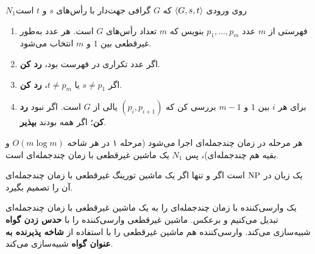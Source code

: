 \begin{example}
\begin{algo}{$N_1$}{روی ورودی $\langle G,s,t\rangle$ که $G$ گرافی جهت‌دار با رأس‌های $s$ و $t$ است}
\begin{enumerate}
\item فهرستی از $m$ عدد $p_1,\dots,p_m$ بنویس که $m$ تعداد رأس‌های $G$ است. هر عدد به‌طور غیرقطعی بین $1$ و $m$ انتخاب می‌شود.
\item اگر عدد تکراری در فهرست بود، \textbf{رد کن}.
\item اگر $s\neq p_1$ یا $t\neq p_m$، \textbf{رد کن}.
\item برای هر $i$ بین $1$ و $m-1$ بررسی کن که $(p_i,p_{i+1})$ یالی از $G$ است. اگر نبود \textbf{رد کن}؛ اگر همه بودند \textbf{بپذیر}.
\end{enumerate}
\end{algo}
هر مرحله در زمان چندجمله‌ای اجرا می‌شود (مرحله ۱ در هر شاخه $O(m\log m)$ و بقیه هم چندجمله‌ای)، پس $N_1$ یک ماشین غیرقطعی با زمان چندجمله‌ای است.
\end{example}

\begin{theorem}\label{thm:np-ntm}
یک زبان در $\mathrm{NP}$ است اگر و تنها اگر یک ماشین تورینگ غیرقطعی با زمان چندجمله‌ای آن را تصمیم بگیرد.
\end{theorem}

\begin{proofidea}
یک وارسی‌کننده با زمان چندجمله‌ای را به یک ماشین غیرقطعی با زمان چندجمله‌ای تبدیل می‌کنیم و برعکس. ماشین غیرقطعی وارسی‌کننده را با \textbf{حدس زدن گواه} شبیه‌سازی می‌کند. وارسی‌کننده هم ماشین غیرقطعی را با استفاده از \textbf{شاخه پذیرنده به عنوان گواه} شبیه‌سازی می‌کند.
\end{proofidea}

